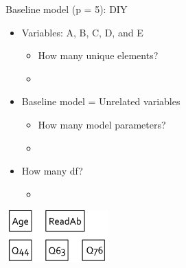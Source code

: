 \documentclass[10pt]{beamer}\usepackage[]{graphicx}\usepackage[]{xcolor}
\begin{document}
\begin{frame}{Baseline model (p = 5): DIY}

\begin{itemize}
\item{Variables: A, B, C, D, and E}  
  \begin{itemize}
    \item{How many unique elements?}
    \item{ }
  \end{itemize}
\vspace{5mm}
\item{Baseline model = Unrelated variables}
  \begin{itemize}
    \item{How many model parameters?}
    \item{ }
  \end{itemize}
\vspace{5mm}
\item{How many df?}
  \begin{itemize}
    \item{ }
  \end{itemize}
\end{itemize}

\vspace{5mm}

\includegraphics[height=2cm,keepaspectratio=T] {baseline5.png}

\end{frame}
%
\end{document}
